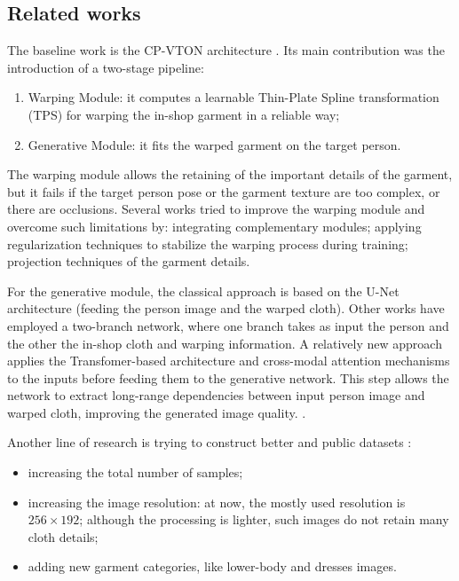 \subsection{Related works}

The baseline work is the CP-VTON architecture \cite{CP-VTON}. Its main contribution was the introduction of a two-stage pipeline:
\begin{enumerate}[noitemsep]
\item Warping Module: it computes a learnable Thin-Plate Spline transformation (TPS) for warping the in-shop garment in a reliable way;
\item Generative Module: it fits the warped garment on the target person.
\end{enumerate}

The warping module allows the retaining of the important details of the garment, but it fails if the target person pose or the garment texture are too complex, or there are occlusions.
Several works tried to improve the warping module and overcome such limitations by: integrating complementary modules; applying regularization techniques to stabilize the warping process during training; projection techniques of the garment details.

For the generative module, the classical approach is based on the U-Net architecture (feeding the person image and the warped cloth).
Other works have employed a two-branch network, where one branch takes as input the person and the other the in-shop cloth and warping information.
A relatively new approach applies the Transfomer-based architecture and cross-modal attention mechanisms to the inputs before feeding them to the generative network. This step allows the network to extract long-range dependencies between input person image and warped cloth, improving the generated image quality. \cite{CIT}\cite{dual-branch}. 

Another line of research is trying to construct better and public datasets \cite{dress-code}:
\begin{itemize}[noitemsep]
\item increasing the total number of samples;
\item increasing the image resolution: at now, the mostly used resolution is $256 \times 192$; although the processing is lighter, such images do not retain many cloth details;
\item adding new garment categories, like lower-body and dresses images.
\end{itemize}



